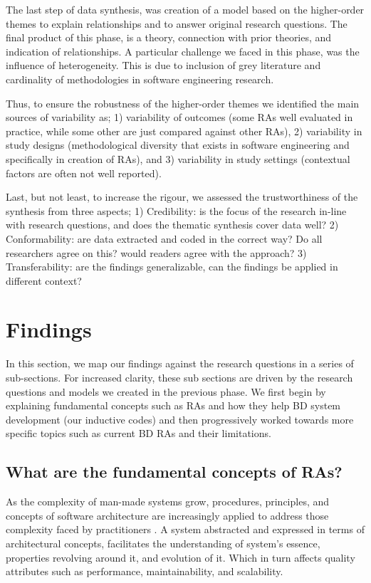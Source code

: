 \documentclass{ieeeaccess}
\begin{document}
The last step of data synthesis, was creation of a model based on the higher-order themes to explain relationships and to answer original research questions. The final product of this phase, is a theory, connection with prior theories, and indication of relationships. A particular challenge we faced in this phase, was the influence of heterogeneity. This is due to inclusion of grey literature and cardinality of methodologies in software engineering research. 

Thus, to ensure the robustness of the higher-order themes we identified the main sources of variability as; 1) variability of outcomes (some RAs well evaluated in practice, while some other are just compared against other RAs), 2) variability in study designs (methodological diversity that exists in software engineering and specifically in creation of RAs), and 3) variability in study settings (contextual factors are often not well reported).

Last, but not least, to increase the rigour, we assessed the trustworthiness of the synthesis from three aspects; 1) Credibility: is the focus of the research in-line with research questions, and does the thematic synthesis cover data well? 2) Conformability: are data extracted and coded in the correct way? Do all researchers agree on this? would readers agree with the approach? 3) Transferability: are the findings generalizable, can the findings be applied in different context? 

\section{Findings}

In this section, we map our findings against the research questions in a series of sub-sections. For increased clarity, these sub sections are driven by the research questions and models we created in the previous phase. We first begin by explaining fundamental concepts such as RAs and how they help BD system development (our inductive codes) and then progressively worked towards more specific topics such as current BD RAs and their limitations.

\subsection{What are the fundamental concepts of RAs?}

As the complexity of man-made systems grow, procedures, principles, and concepts of software architecture are increasingly applied to address those complexity faced by practitioners \cite{AtaeiACIS}. A system abstracted and expressed in terms of architectural concepts, facilitates the understanding of system’s essence, properties revolving around it, and evolution of it. Which in turn affects quality attributes such as performance, maintainability, and scalability. 
\end{document}
